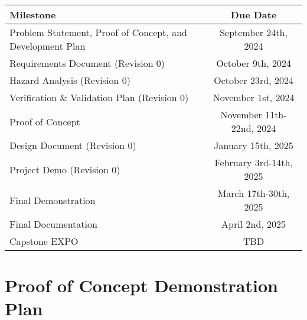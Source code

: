 \documentclass{article}
\begin{document}
\begin{center}
  \begin{tabularx}{\textwidth}{Xc}
    \toprule
    \textbf{Milestone} & \textbf{Due Date} \\
    \midrule
    Problem Statement, Proof of Concept, and Development Plan &
    September 24th, 2024 \\
    Requirements Document (Revision 0) & October 9th, 2024 \\
    Hazard Analysis (Revision 0) & October 23rd, 2024 \\
    Verification \& Validation Plan (Revision 0) & November 1st, 2024 \\
    Proof of Concept & November 11th-22nd, 2024 \\
    Design Document (Revision 0) & January 15th, 2025 \\
    Project Demo (Revision 0) & February 3rd-14th, 2025 \\
    Final Demonstration & March 17th-30th, 2025 \\
    Final Documentation & April 2nd, 2025 \\
    Capstone EXPO & TBD \\
    \bottomrule
  \end{tabularx}
\end{center}

\section{Proof of Concept Demonstration Plan}
\end{document}
